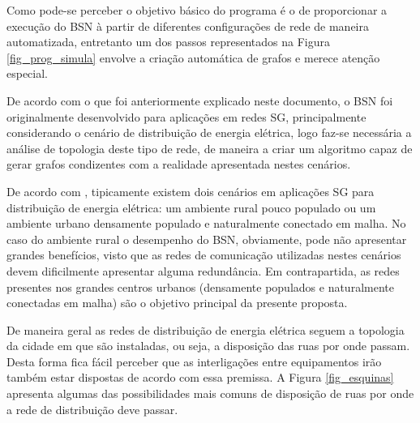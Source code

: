 Como pode-se perceber o objetivo básico do programa é o de proporcionar a execução do BSN à partir de diferentes configurações de rede de maneira automatizada, entretanto um dos passos representados na Figura \ref{fig_prog_simula} envolve a criação automática de grafos e merece atenção especial.

De acordo com o que foi anteriormente explicado neste documento, o BSN foi originalmente desenvolvido para aplicações em redes SG, principalmente considerando o cenário de distribuição de energia elétrica, logo faz-se necessária a análise de topologia deste tipo de rede, de maneira a criar um algoritmo capaz de gerar grafos condizentes com a realidade apresentada nestes cenários.

De acordo com \cite{Conf-Sood2009}, tipicamente existem dois cenários em aplicações SG para distribuição de energia elétrica: um ambiente rural pouco populado ou um ambiente urbano densamente populado e naturalmente conectado em malha. No caso do ambiente rural o desempenho do BSN, obviamente, pode não apresentar grandes benefícios, visto que as redes de comunicação utilizadas nestes cenários devem dificilmente apresentar alguma redundância. Em contrapartida, as redes presentes nos grandes centros urbanos (densamente populados e naturalmente conectadas em malha) são o objetivo principal da presente proposta.

De maneira geral as redes de distribuição de energia elétrica seguem a topologia da cidade em que são instaladas, ou seja, a disposição das ruas por onde passam. Desta forma fica fácil perceber que as interligações entre equipamentos irão também estar dispostas de acordo com essa premissa. A Figura \ref{fig_esquinas} apresenta algumas das possibilidades mais comuns de disposição de ruas por onde a rede de distribuição deve passar.

